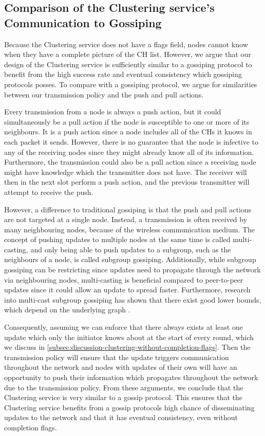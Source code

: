 \subsection{Comparison of the Clustering service's Communication to Gossiping}


\begin{newtext}
Because the Clustering service does not have a flags field, nodes cannot know when they have a complete picture of the CH list. However, we argue that our design of the Clustering service is sufficiently similar to a gossiping protocol to benefit from the high success rate and eventual consistency which gossiping protocols posses. To compare with a gossiping protocol, we argue for similarities between our transmission policy and the push and pull actions.


Every transmission from a node is always a push action, but it could simultaneously be a pull action if the node is susceptible to one or more of its neighbours. It is a push action since a node includes all of the CHs it knows in each packet it sends. However, there is no guarantee that the node is infective to any of the receiving nodes since they might already know all of its information. Furthermore, the transmission could also be a pull action since a receiving node might have knowledge which the transmitter does not have. The receiver will then in the next slot perform a push action, and the previous transmitter will attempt to receive the push.


However, a difference to traditional gossiping is that the push and pull actions are not targeted at a single node. Instead, a transmission is often received by many neighbouring nodes, because of the wireless communication medium. The concept of pushing updates to multiple nodes at the same time is called multi-casting, and only being able to push updates to a subgroup, such as the neighbours of a node, is called subgroup gossiping. Additionally, while subgroup gossiping can be restricting since updates need to propagate through the network via neighbouring nodes, multi-casting is beneficial compared to peer-to-peer updates since it could allow an update to spread faster. Furthermore, research into multi-cast subgroup gossiping has shown that there exist good lower bounds, which depend on the underlying graph \cite{Liestman1984-gossiping-conference-calls}.


Consequently, assuming we can enforce that there always exists at least one update which only the initiator knows about at the start of every round, which we discuss in \cref{subsec:discussion-clustering-without-completion-flags}. Then the transmission policy will ensure that the update triggers communication throughout the network and nodes with updates of their own will have an opportunity to push their information which propagates throughout the network due to the transmission policy. From these arguments, we conclude that the Clustering service is very similar to a gossip protocol. This ensures that the Clustering service benefits from a gossip protocols high chance of disseminating updates to the network and that it has eventual consistency, even without completion flags.
\end{newtext}

